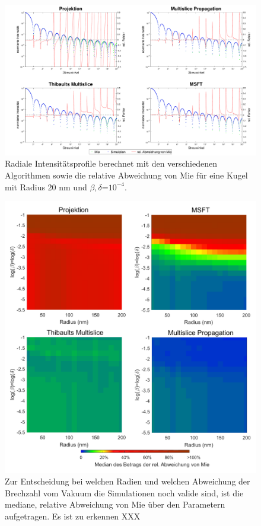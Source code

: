 \begin{figure} %
	\centering
	\includegraphics[width=1\textwidth]{images/fig_sim_profile.pdf}
	\caption[Radiale Profile]{Radiale Intensitätsprofile berechnet mit den verschiedenen Algorithmen sowie die relative Abweichung von Mie für eine Kugel mit Radius 20 \si{nm} und $\beta,\delta$=$10^{-4}$.}
	\label{fig:profil}
\end{figure}

\begin{figure} %
	\centering
	\includegraphics[width=1\textwidth]{images/fig_sim_var.pdf}
	\caption[Gültigkeit der Simulationsalgorithmen]{Zur Entscheidung bei welchen Radien und welchen Abweichung der Brechzahl vom Vakuum die Simulationen noch valide sind, ist die mediane, relative Abweichung von Mie über den Parametern aufgetragen. Es ist zu erkennen XXX}
	\label{fig:variation}
\end{figure}



